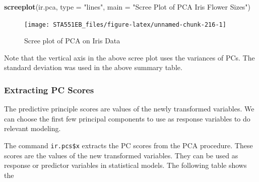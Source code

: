 \documentclass[
]{book}
\newenvironment{Shaded}{\begin{snugshade}}{\end{snugshade}}
\newcommand{\AttributeTok}[1]{\textcolor[rgb]{0.13,0.29,0.53}{#1}}
\newcommand{\DecValTok}[1]{\textcolor[rgb]{0.00,0.00,0.81}{#1}}
\newcommand{\FunctionTok}[1]{\textcolor[rgb]{0.13,0.29,0.53}{\textbf{#1}}}
\newcommand{\NormalTok}[1]{#1}
\newcommand{\SpecialCharTok}[1]{\textcolor[rgb]{0.81,0.36,0.00}{\textbf{#1}}}
\newcommand{\StringTok}[1]{\textcolor[rgb]{0.31,0.60,0.02}{#1}}
\begin{document}
\begin{Shaded}
\begin{Highlighting}[]
\FunctionTok{screeplot}\NormalTok{(ir.pca, }
          \AttributeTok{type =} \StringTok{"lines"}\NormalTok{,}
          \AttributeTok{main =} \StringTok{"Scree Plot of PCA Iris Flower Sizes"}\NormalTok{)}
\end{Highlighting}
\end{Shaded}

\begin{figure}

{\centering \texttt{[image: STA551EB\_files/figure-latex/unnamed-chunk-216-1]} 

}

\caption{Scree plot of PCA on Iris Data}\label{fig:unnamed-chunk-216}
\end{figure}

Note that the vertical axis in the above scree plot uses the variances of PCs. The standard deviation was used in the above summary table.

\hypertarget{extracting-pc-scores}{%
\subsubsection{Extracting PC Scores}\label{extracting-pc-scores}}

The predictive principle scores are values of the newly transformed variables. We can choose the first few principal components to use as response variables to do relevant modeling.

The command \texttt{ir.pcs\$x} extracts the PC scores from the PCA procedure. These scores are the values of the new transformed variables. They can be used as response or predictor variables in statistical models. The following table shows the

\begin{Shaded}
\end{Shaded}
\end{document}
